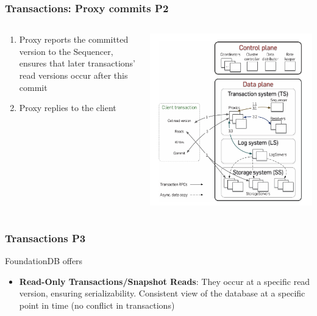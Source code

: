 \begin{frame}
    \frametitle{Transactions: Proxy commits P2}
    \begin{columns}
        \begin{column}{0.5\textwidth}
            \begin{enumerate}
    \item Proxy reports the committed version to the Sequencer, ensures that later transactions' read versions occur after this commit
    \item Proxy replies to the client
            \end{enumerate}
        \end{column}
        \begin{column}{0.5\textwidth}
            \centering
            \includegraphics[width=\textwidth]{img/2-Architecture/Architecture and transaction processing.png}
        \end{column}
    \end{columns}
\end{frame}

\begin{frame}
	\frametitle{Transactions P3}

 FoundationDB offers
 
 \begin{itemize}
     \item \textbf{Read-Only Transactions/Snapshot Reads}: They occur at a specific read version, ensuring serializability. Consistent view of the database at a specific point in time (no conflict in transactions)
 \end{itemize}

\end{frame}


